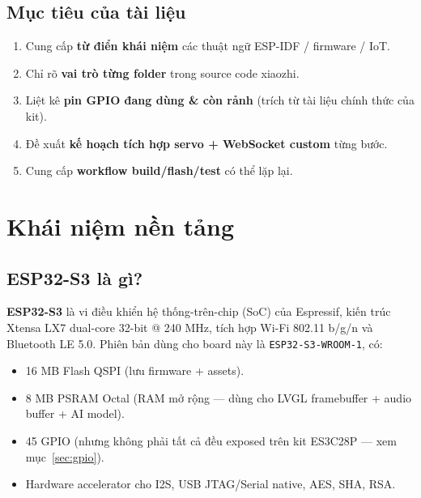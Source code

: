 \documentclass[11pt,a4paper]{article}
\begin{document}
\subsection{Mục tiêu của tài liệu}
\begin{enumerate}
  \item Cung cấp \textbf{từ điển khái niệm} các thuật ngữ ESP-IDF / firmware / IoT.
  \item Chỉ rõ \textbf{vai trò từng folder} trong source code xiaozhi.
  \item Liệt kê \textbf{pin GPIO đang dùng \& còn rảnh} (trích từ tài liệu chính thức của kit).
  \item Đề xuất \textbf{kế hoạch tích hợp servo + WebSocket custom} từng bước.
  \item Cung cấp \textbf{workflow build/flash/test} có thể lặp lại.
\end{enumerate}

\section{Khái niệm nền tảng}
\subsection{ESP32-S3 là gì?}
\textbf{ESP32-S3} là vi điều khiển hệ thống-trên-chip (SoC) của Espressif, kiến trúc Xtensa LX7 dual-core 32-bit @ 240 MHz, tích hợp Wi-Fi 802.11 b/g/n và Bluetooth LE 5.0. Phiên bản dùng cho board này là \texttt{ESP32-S3-WROOM-1}, có:
\begin{itemize}
  \item 16 MB Flash QSPI (lưu firmware + assets).
  \item 8 MB PSRAM Octal (RAM mở rộng — dùng cho LVGL framebuffer + audio buffer + AI model).
  \item 45 GPIO (nhưng không phải tất cả đều exposed trên kit ES3C28P — xem mục~\ref{sec:gpio}).
  \item Hardware accelerator cho I2S, USB JTAG/Serial native, AES, SHA, RSA.
\end{itemize}
\end{document}
